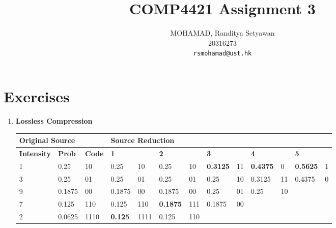 \documentclass[12pt,a4paper]{article}
\title{COMP4421 Assignment 3}
\author{MOHAMAD, Randitya Setyawan\\20316273\\ \texttt{rsmohamad@ust.hk}}
\begin{document}
	\maketitle
	
	\section*{Exercises}
	\begin{enumerate}
		\item \textbf{Lossless Compression}
			\begin{table}[H]
			\begin{tabular}{|l|l|l|l|l|l|l|l|l|l|l|l|l|}
			\hline
			\multicolumn{3}{|l|}{\textbf{Original Source}}            & \multicolumn{10}{l|}{\textbf{Source Reduction}}                                                                                                                         \\ \hline
			\textbf{Intensity} & \textbf{Prob} & \textbf{Code} & \multicolumn{2}{l|}{\textbf{1}} & \multicolumn{2}{l|}{\textbf{2}} & \multicolumn{2}{l|}{\textbf{3}} & \multicolumn{2}{l|}{\textbf{4}} & \multicolumn{2}{l|}{\textbf{5}} \\ \hline
			1                  & 0.25                 & 10            & 0.25                & 10        & 0.25                 & 10       & \textbf{0.3125}       & 11      & \textbf{0.4375}       & 0       & \textbf{0.5625}       & 1       \\ \hline
			3                  & 0.25                 & 01            & 0.25                & 01        & 0.25                 & 01       & 0.25                  & 10      & 0.3125                & 11      & 0.4375                & 0       \\ \cline{1-9} \cline{11-13} 
			9                  & 0.1875               & 00            & 0.1875              & 00        & 0.1875               & 00       & 0.25                  & 01      & 0.25                  & 10      & \multicolumn{2}{l|}{}           \\ \cline{1-7} \cline{9-13} 
			7                  & 0.125                & 110           & 0.125               & 110       & \textbf{0.1875}      & 111      & 0.1875                & 00      & \multicolumn{4}{l|}{}                                             \\ \cline{1-5} \cline{7-13} 
			2                  & 0.0625               & 1110          & \textbf{0.125}      & 1111      & 0.125                & 110      & \multicolumn{6}{l|}{}                                                                               \\ \cline{1-3} \cline{5-13} 

\end{tabular}
\end{table}
\end{enumerate}
\end{document}
